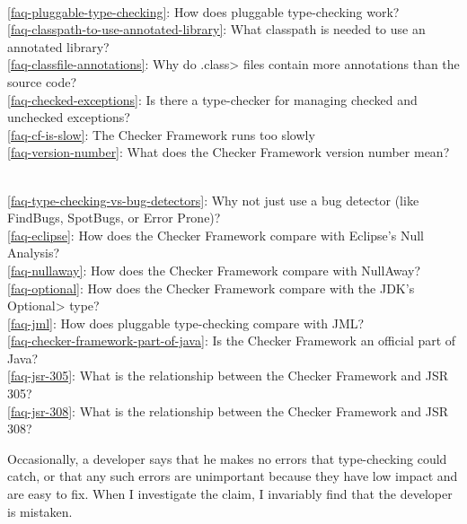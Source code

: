\\ \ref{faq-pluggable-type-checking}: How does pluggable type-checking work?
\\ \ref{faq-classpath-to-use-annotated-library}: What classpath is needed to use an annotated library?
\\ \ref{faq-classfile-annotations}: Why do \<.class> files contain more annotations than the source code?
\\ \ref{faq-checked-exceptions}: Is there a type-checker for managing checked and unchecked exceptions?
\\ \ref{faq-cf-is-slow}: The Checker Framework runs too slowly
\\ \ref{faq-version-number}: What does the Checker Framework version number mean?

\\ \ref{faq-type-checking-vs-bug-detectors}: Why not just use a bug detector (like FindBugs, SpotBugs, or Error Prone)?
\\ \ref{faq-eclipse}: How does the Checker Framework compare with Eclipse's Null Analysis?
\\ \ref{faq-nullaway}: How does the Checker Framework compare with NullAway?
\\ \ref{faq-optional}: How does the Checker Framework compare with the JDK's \<Optional> type?
\\ \ref{faq-jml}: How does pluggable type-checking compare with JML?
\\ \ref{faq-checker-framework-part-of-java}: Is the Checker Framework an official part of Java?
\\ \ref{faq-jsr-305}: What is the relationship between the Checker Framework and JSR 305?
\\ \ref{faq-jsr-308}: What is the relationship between the Checker Framework and JSR 308?




Occasionally, a developer says that he makes no errors that type-checking
could catch, or that any such errors are unimportant because they have low
impact and are easy to fix.  When I investigate the claim, I invariably
find that the developer is mistaken.

